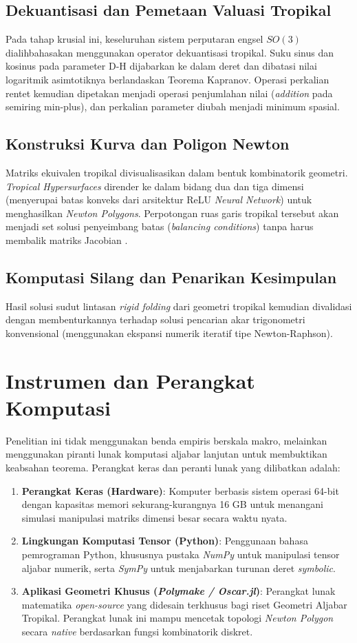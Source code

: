 \subsection{Dekuantisasi dan Pemetaan Valuasi Tropikal}
Pada tahap krusial ini, keseluruhan sistem perputaran engsel $SO(3)$ dialihbahasakan menggunakan operator dekuantisasi tropikal. Suku sinus dan kosinus pada parameter D-H dijabarkan ke dalam deret dan dibatasi nilai logaritmik asimtotiknya berlandaskan Teorema Kapranov. Operasi perkalian rentet kemudian dipetakan menjadi operasi penjumlahan nilai (\textit{addition} pada semiring min-plus), dan perkalian parameter diubah menjadi minimum spasial.

\subsection{Konstruksi Kurva dan Poligon Newton}
Matriks ekuivalen tropikal divisualisasikan dalam bentuk kombinatorik geometri. \textit{Tropical Hypersurfaces} dirender ke dalam bidang dua dan tiga dimensi (menyerupai batas konveks dari arsitektur ReLU \textit{Neural Network}) untuk menghasilkan \textit{Newton Polygons}. Perpotongan ruas garis tropikal tersebut akan menjadi set solusi penyeimbang batas (\textit{balancing conditions}) tanpa harus membalik matriks Jacobian \parencite{nekrasov2018geometry}.

\subsection{Komputasi Silang dan Penarikan Kesimpulan}
Hasil solusi sudut lintasan \textit{rigid folding} dari geometri tropikal kemudian divalidasi dengan membenturkannya terhadap solusi pencarian akar trigonometri konvensional (menggunakan ekspansi numerik iteratif tipe Newton-Raphson). 

\section{Instrumen dan Perangkat Komputasi}
Penelitian ini tidak menggunakan benda empiris berskala makro, melainkan menggunakan piranti lunak komputasi aljabar lanjutan untuk membuktikan keabsahan teorema. Perangkat keras dan peranti lunak yang dilibatkan adalah:
\begin{enumerate}
    \item \textbf{Perangkat Keras (Hardware)}: Komputer berbasis sistem operasi 64-bit dengan kapasitas memori sekurang-kurangnya 16 GB untuk menangani simulasi manipulasi matriks dimensi besar secara waktu nyata.
    \item \textbf{Lingkungan Komputasi Tensor (Python)}: Penggunaan bahasa pemrograman Python, khususnya pustaka \textit{NumPy} untuk manipulasi tensor aljabar numerik, serta \textit{SymPy} untuk menjabarkan turunan deret \textit{symbolic}.
    \item \textbf{Aplikasi Geometri Khusus (\textit{Polymake / Oscar.jl})}: Perangkat lunak matematika \textit{open-source} yang didesain terkhusus bagi riset Geometri Aljabar Tropikal. Perangkat lunak ini mampu mencetak topologi \textit{Newton Polygon} secara \textit{native} berdasarkan fungsi kombinatorik diskret.
\end{enumerate}

